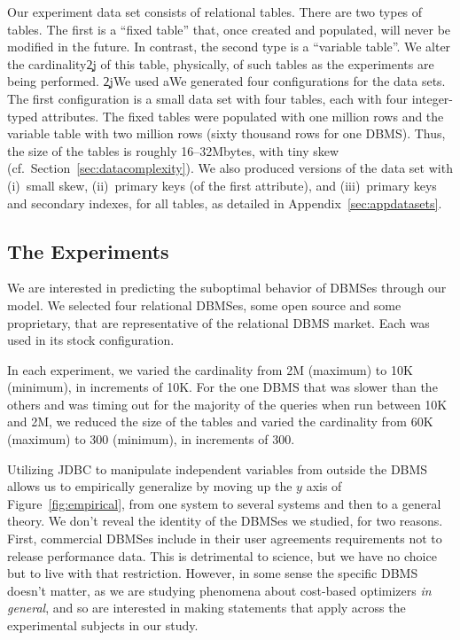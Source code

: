 \documentclass[prodmode,acmtods]{acmsmall}
\begin{document}
Our experiment data set consists of relational tables. There are two types of
tables. The first is a ``fixed table'' that, once created and
populated, will never be modified in the future.  In contrast, the second
type is a ``variable table''. We alter the cardinality\c2j{ of
  this table}{, physically, of such tables} as the experiments are being performed. 
\c2j{We used a}{We generated four configurations for the data sets. The first configuration
is a small} data set with four tables, each with four integer-typed
attributes. The fixed tables were populated with one million rows and the
variable table with two million rows (sixty thousand rows for one DBMS). Thus, the size of the tables is roughly 16--32Mbytes, with tiny skew (cf.~Section~\ref{sec:datacomplexity}). We also produced versions of the data set
with (i)~small skew, (ii)~primary keys (of the first attribute), and (iii)~primary
keys and secondary indexes, for all tables, as detailed in Appendix~\ref{sec:appdatasets}.

\subsection{The Experiments}\label{sec:experiments}

We are interested in predicting the suboptimal behavior of \hbox{DBMSes} through our
model. We selected four relational
\hbox{DBMSes}, some open source and some proprietary, that are representative of
the relational \hbox{DBMS} market. Each was used in its stock configuration.

In each experiment, we varied the
cardinality from 2M (maximum) to 10K (minimum), in increments of 10K. For
the one \hbox{DBMS} that was slower than the others and was timing out for
the majority of the queries when run between 10K and 2M, we reduced the
size of the tables and varied the cardinality from 60K (maximum) to 300 
(minimum), in increments of 300.

Utilizing JDBC to manipulate independent variables from outside the
  \hbox{DBMS} allows us to empirically generalize by moving up the $y$ axis of
  Figure~\ref{fig:empirical}, from one system to several systems and then to
  a general theory. We don't reveal the identity of the \hbox{DBMSes} we studied, for two reasons. First, commercial \hbox{DBMSes}
include in their user agreements requirements not to release 
performance data. This is detrimental to science, but we have no choice but
to live with that restriction. However, in some sense the specific \hbox{DBMS}
doesn't matter, as we are studying phenomena about cost-based optimizers
{\em in general}, and so are interested in making statements that apply across
the experimental subjects in our study.
\end{document}
